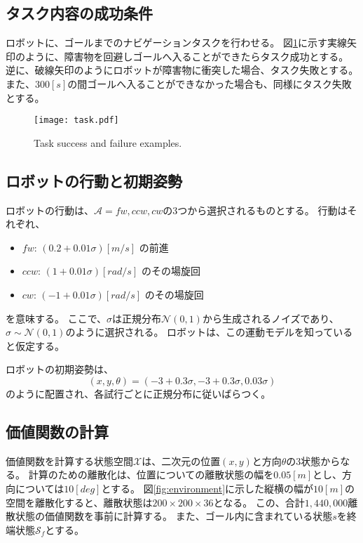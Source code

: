 \subsection{タスク内容の成功条件}
ロボットに、ゴールまでのナビゲーションタスクを行わせる。
図\ref{fig:task}に示す実線矢印のように、障害物を回避しゴールへ入ることができたらタスク成功とする。
逆に、破線矢印のようにロボットが障害物に衝突した場合、タスク失敗とする。
また、$300[\si{s}]$の間ゴールへ入ることができなかった場合も、同様にタスク失敗とする。

\begin{figure}[tbp]
  \begin{center}
    \texttt{[image: task.pdf]}
    \caption{Task success and failure examples.}
    \label{fig:task}
  \end{center}
\end{figure}

\subsection{ロボットの行動と初期姿勢}
ロボットの行動は、$\mathcal{A} = { fw, ccw, cw }$の3つから選択されるものとする。
行動はそれぞれ、
\begin{itemize}
  \item $fw$: $(0.2 + 0.01\sigma) \si{[m/s]}$ の前進
  \item $ccw$: $(1 + 0.01\sigma) \si{[rad/s]}$ のその場旋回
  \item $cw$: $(-1 + 0.01\sigma) \si{[rad/s]}$ のその場旋回
\end{itemize}
を意味する。
ここで、$\sigma$は正規分布$\mathcal{N}(0, 1)$から生成されるノイズであり、$\sigma \sim \mathcal{{N}}(0, 1)$のように選択される。
ロボットは、この運動モデルを知っていると仮定する。

ロボットの初期姿勢は、
\begin{equation}
\label{robot initial pose}
  (x, y, \theta) = (-3 + 0.3\sigma, -3 + 0.3\sigma, 0.03\sigma)
\end{equation}
のように配置され、各試行ごとに正規分布に従いばらつく。

\subsection{価値関数の計算}
価値関数を計算する状態空間$\mathcal{X}$は、二次元の位置$(x, y)$と方向$\theta$の3状態からなる。
計算のための離散化は、位置についての離散状態の幅を$0.05\si{[m]}$とし、方向については$10\si{[deg]}$とする。
図\ref{fig:environment}に示した縦横の幅が$10\si{[m]}$の空間を離散化すると、離散状態は$200 \times 200 \times 36$となる。
この、合計$1,440,000$離散状態の価値関数を事前に計算する。
また、ゴール内に含まれている状態$s$を終端状態$\mathcal{S}_f$とする。


